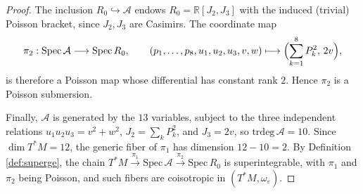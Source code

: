 \documentclass[11pt]{amsart}
\theoremstyle{definition}
\theoremstyle{plain}
\theoremstyle{conclusion}
\begin{document}
\begin{proof}
The inclusion $R_0\hookrightarrow\mathcal{A}$ endows $R_0=\mathbb{R}[J_2,J_3]$ with the induced (trivial) Poisson bracket, since $J_2,J_3$ are Casimirs. The coordinate map
\begin{align*}
\pi_2:\mathrm{Spec}\,\mathcal{A}\longrightarrow\mathrm{Spec}\,R_0,\qquad
(p_1,\ldots,p_8,u_1,u_2,u_3,v,w)\longmapsto\Bigl(\sum_{k=1}^8 P_k^2,\,2v\Bigr),
\end{align*}
is therefore a Poisson map whose differential has constant rank $2$. Hence $\pi_2$ is a Poisson submersion.

Finally, $\mathcal{A}$ is generated by the $13$ variables, subject to the three independent relations $u_1u_2u_3=v^2+w^2$, $J_2=\sum_k P_k^2$, and $J_3=2v$, so $\mathrm{trdeg}\,\mathcal{A}=10$. Since $\dim T^*M=12$, the generic fiber of $\pi_1$ has dimension $12-10=2$. By Definition \ref{def:superge}, the chain $T^*M\xrightarrow{\pi_1}\mathrm{Spec}\,\mathcal{A}\xrightarrow{\pi_2}\mathrm{Spec}\,R_0$ is superintegrable, with $\pi_1$ and $\pi_2$ being Poisson, and such fibers are coisotropic in $(T^*M,\omega_\varepsilon)$.
\end{proof}

 
\end{document}
